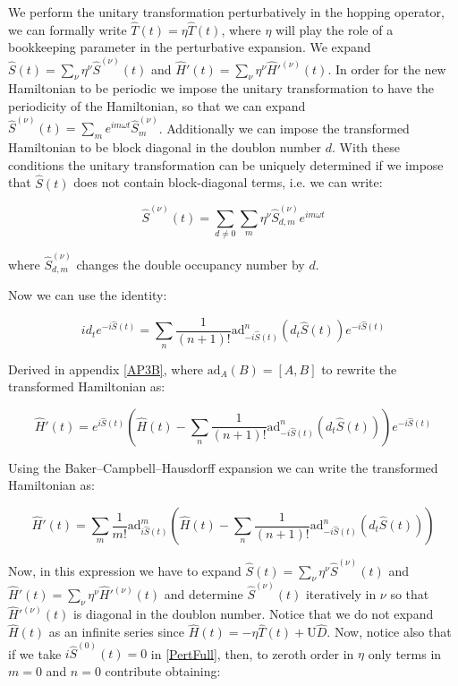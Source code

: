 We perform the unitary transformation perturbatively in the hopping operator, we can formally write $\hat{T}(t) = \eta \hat{T}(t)$, where $\eta$ will play the role of a bookkeeping parameter in the perturbative expansion. We expand $\hat{S}(t) = \sum_\nu \eta^\nu \hat{S}^{(\nu)}(t)$ and $\hat{H}'(t) = \sum_\nu \eta^\nu \hat{H}'^{(\nu)}(t)$. In order for the new Hamiltonian to be periodic we impose the unitary transformation to have the periodicity of the Hamiltonian, so that we can expand $\hat{S}^{(\nu)}(t) = \sum_m e^{im\omega t}\hat{S}^{(\nu)}_m$. Additionally we can impose the transformed Hamiltonian to be block diagonal in the doublon number $d$. With these conditions the unitary transformation can be uniquely determined if we impose that $\hat{S}(t)$ does not contain block-diagonal terms, i.e. we can write:

\begin{equation}
\hat{S}^{(\nu)}(t) = \sum_{d \neq 0} \sum_m \eta^\nu \hat{S}^{(\nu)}_{d,m} e^{im\omega t}
\end{equation}

where $\hat{S}^{(\nu)}_{d,m}$ changes the double occupancy number by $d$.

Now we can use the identity:

\begin{equation}
id_t e^{-i\hat{S}(t)} = \sum_n \frac{1}{(n+1)!}\text{ad}_{-i\hat{S}(t)}^n (d_t \hat{S}(t))e^{-i\hat{S}(t)}
\end{equation}

Derived in appendix \ref{AP3B}, where $\text{ad}_A(B) = [A,B]$ to rewrite the transformed Hamiltonian as:

\begin{equation}
\hat{H}'(t) = e^{i\hat{S}(t)} \left( \hat{H}(t) - \sum_n \frac{1}{(n+1)!}\text{ad}_{-i\hat{S}(t)}^n (d_t \hat{S}(t)) \right) e^{-i\hat{S}(t)}
\end{equation}

Using the Baker–Campbell–Hausdorff expansion we can write the transformed Hamiltonian as:

\begin{equation}
\label{PertFull}
\hat{H}'(t) = \sum_m \frac{1}{m!} \text{ad}_{i\hat{S}(t)}^m \left( \hat{H}(t) - \sum_n \frac{1}{(n+1)!}\text{ad}_{-i\hat{S}(t)}^n (d_t \hat{S}(t)) \right)
\end{equation}

Now, in this expression we have to expand $\hat{S}(t) = \sum_\nu \eta^\nu \hat{S}^{(\nu)}(t)$ and $\hat{H}'(t) = \sum_\nu \eta^\nu \hat{H}'^{(\nu)}(t)$ and determine $\hat{S}^{(\nu)}(t)$ iteratively in $\nu$ so that $\hat{H}'^{(\nu)}(t)$ is diagonal in the doublon number. Notice that we do not expand $\hat{H}(t)$ as an infinite series since $\hat{H}(t) = -\eta \hat{T}(t) + \text{U}\hat{D}$. Now, notice also that if we take $i\hat{S}^{(0)}(t)=0$ in \ref{PertFull}, then, to zeroth order in $\eta$ only terms in $m=0$ and $n=0$ contribute obtaining:

